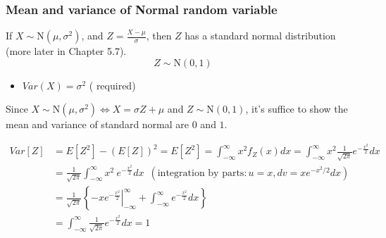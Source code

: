 \documentclass[slidestop,compress,mathserif]{beamer}
\begin{document}
\begin{frame}\frametitle{Mean and variance of Normal random variable}
If $X \sim \text{N}(\mu, \sigma^2)$, and $Z = \frac{X - \mu}{\sigma}$, then $Z$ has a standard normal distribution (more later in Chapter 5.7).
\[ Z \sim \text{N}(0, 1) \]

\begin{itemize}
\item $Var(X) = \sigma^2$ ({\color{red} required})
\end{itemize}


\hspace{0.5cm}
Since $X \sim \text{N}(\mu, \sigma^2) \Longleftrightarrow X = \sigma Z + \mu$ and $Z \sim \text{N}(0, 1)$,
it's suffice to show the mean and variance of standard normal are $0$ and $1$.

\pause
{\footnotesize{
\begin{align*}
Var[Z] & = E[Z^2]  - (E[Z])^2 = E[Z^2] = \int_{-\infty}^{\infty} x^2 f_Z(x) dx = \int_{-\infty}^{\infty} x^2 \frac{1}{\sqrt{2\pi}} e^{-\frac{x^2}{2}}dx\\
& = \frac{1}{\sqrt{2\pi}}\int_{-\infty}^{\infty} x^2~e^{-\frac{x^2}{2}}dx \,\,\, (\text{integration by parts}: u = x, dv = xe^{-x^2/2}dx) \\
& = \frac{1}{\sqrt{2\pi}}\left\{  - \left. xe^{-\frac{x^2}{2}}\right|_{-\infty}^{\infty} + \int_{-\infty}^{\infty} e^{-\frac{x^2}{2}}dx\right\}\\
& = \int_{-\infty}^{\infty} \frac{1}{\sqrt{2\pi}}e^{-\frac{x^2}{2}}dx =1
\end{align*}
}}

\end{frame}


\end{document}
